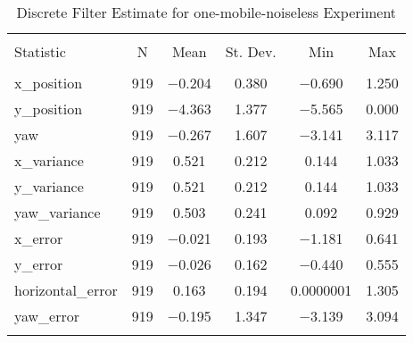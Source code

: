 
\begin{table}[h] \centering 
  \caption{Discrete Filter Estimate for one-mobile-noiseless Experiment} 
  \label{tab:one_mobile_noiseless_discrete_summary} 
\begin{tabular}{@{\extracolsep{5pt}}lccccc} 
\\[-1.8ex]\hline 
\hline \\[-1.8ex] 
Statistic & \multicolumn{1}{c}{N} & \multicolumn{1}{c}{Mean} & \multicolumn{1}{c}{St. Dev.} & \multicolumn{1}{c}{Min} & \multicolumn{1}{c}{Max} \\ 
\hline \\[-1.8ex] 
x\_position & 919 & $-$0.204 & \num{0.380} & $-$0.690 & \num{1.250} \\ 
y\_position & 919 & $-$4.363 & \num{1.377} & $-$5.565 & \num{0.000} \\ 
yaw & 919 & $-$0.267 & \num{1.607} & $-$3.141 & \num{3.117} \\ 
x\_variance & 919 & \num{0.521} & \num{0.212} & \num{0.144} & \num{1.033} \\ 
y\_variance & 919 & \num{0.521} & \num{0.212} & \num{0.144} & \num{1.033} \\ 
yaw\_variance & 919 & \num{0.503} & \num{0.241} & \num{0.092} & \num{0.929} \\ 
x\_error & 919 & $-$0.021 & \num{0.193} & $-$1.181 & \num{0.641} \\ 
y\_error & 919 & $-$0.026 & \num{0.162} & $-$0.440 & \num{0.555} \\ 
horizontal\_error & 919 & \num{0.163} & \num{0.194} & \num{0.0000001} & \num{1.305} \\ 
yaw\_error & 919 & $-$0.195 & \num{1.347} & $-$3.139 & \num{3.094} \\ 
\hline \\[-1.8ex] 
\end{tabular} 
\end{table} 
